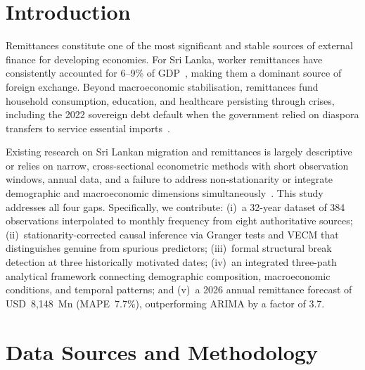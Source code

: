 \documentclass[sigconf]{acmart}
\begin{document}
\section{Introduction}
Remittances constitute one of the most significant and stable sources of external finance for developing economies. For Sri Lanka, worker remittances have consistently accounted for 6--9\% of GDP~\cite{remittance-gdp}, making them a dominant source of foreign exchange. Beyond macroeconomic stabilisation, remittances fund household consumption, education, and healthcare persisting through crises, including the 2022 sovereign debt default when the government relied on diaspora transfers to service essential imports~\cite{ilo-migration}.

Existing research on Sri Lankan migration and remittances is largely descriptive or relies on narrow, cross-sectional econometric methods with short observation windows, annual data, and a failure to address non-stationarity or integrate demographic and macroeconomic dimensions simultaneously~\cite{ramanayake2018,ilo-migration}. This study addresses all four gaps. Specifically, we contribute: (i)~a 32-year dataset of 384 observations interpolated to monthly frequency from eight authoritative sources; (ii)~stationarity-corrected causal inference via Granger tests and VECM that distinguishes genuine from spurious predictors; (iii)~formal structural break detection at three historically motivated dates; (iv)~an integrated three-path analytical framework connecting demographic composition, macroeconomic conditions, and temporal patterns; and (v)~a 2026 annual remittance forecast of USD~8,148~Mn (MAPE~7.7\%), outperforming ARIMA by a factor of 3.7.

\section{Data Sources and Methodology}
\end{document}
